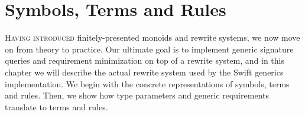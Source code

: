 \documentclass[../generics]{subfiles}
\begin{document}
\chapter{Symbols, Terms and Rules}\label{symbols terms rules}

%
%
\lettrine{H}{aving introduced} finitely-presented monoids and rewrite systems, we now move on from theory to practice. Our ultimate goal is to implement generic signature queries and requirement minimization on top of a rewrite system, and in this chapter we will describe the actual rewrite system used by the Swift generics implementation. We begin with the concrete representations of symbols, terms and rules. Then, we show how type parameters and generic requirements translate to terms and rules.
\end{document}
